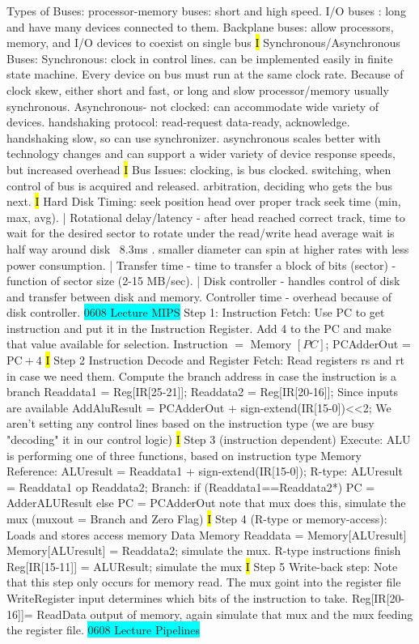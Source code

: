 \documentclass[fontsize=4pt]{scrartcl}
\begin{document}
Types of Buses: processor-memory buses: short and high speed. I/O buses : long and have many devices connected to them. Backplane buses: allow processors, memory, and I/O devices to coexist on single bus
\hl{I}
Synchronous/Asynchronous Buses: Synchronous: clock in control lines. can be implemented easily in finite state machine. Every device on bus must run at the same clock rate. Because of clock skew, either short and fast, or long and slow processor/memory usually synchronous. Asynchronous- not clocked: can accommodate wide variety of devices. handshaking protocol: read-request data-ready, acknowledge. handshaking slow, so can use synchronizer. asynchronous scales better with technology changes and can support a wider variety of device response speeds, but increased overhead
\hl{I} Bus Issues: clocking, is bus clocked. switching, when control of bus is acquired and released. arbitration, deciding who gets the bus next.
\hl{I} Hard Disk Timing: seek position head over proper track seek time (min, max, avg). | Rotational delay/latency - after head reached correct track, time to wait for the desired sector to rotate under the read/write head average wait is half way around disk ~8.3ms . smaller diameter can spin at higher rates with less power consumption. | Transfer time - time to transfer a block of bits (sector) - function of sector size (2-15 MB/sec). | Disk controller - handles control of disk and transfer between disk and memory. Controller time - overhead because of disk controller.
\colorbox{Cyan}{0608 Lecture MIPS} Step 1: Instruction Fetch: Use PC to get instruction and put it in the Instruction Register. Add 4 to the PC and make that value available for selection. Instruction $=$ Memory $[P C]$; PCAdderOut =$\mathrm{PC}+4$
\hl{I}
Step 2 Instruction Decode and Register Fetch: Read registers rs and rt in case we need them. Compute the branch address in case the instruction is a branch Readdata1 = Reg[IR[25-21]]; Readdata2 = Reg[IR[20-16]]; Since inputs are available AddAluResult = PCAdderOut + sign-extend(IR[15-0])<<2;	We aren't setting any control lines based on the instruction type (we are busy "decoding" it in our control logic)
\hl{I}
Step 3 (instruction dependent) Execute: ALU is performing one of three functions, based on instruction type Memory Reference: ALUresult = Readdata1 + sign-extend(IR[15-0]); R-type: ALUresult = Readdata1 op Readdata2; Branch: if (Readdata1==Readdata2*) PC = AdderALUResult else PC = PCAdderOut  note that mux does this, simulate the mux (muxout = Branch and Zero Flag)
\hl{I}
Step 4 (R-type or memory-access): Loads and stores access memory Data Memory Readdata = Memory[ALUresult] Memory[ALUresult] = Readdata2; simulate the mux. R-type instructions finish	Reg[IR[15-11]] = ALUResult;  simulate the mux
\hl{I}
Step 5 Write-back step: Note that this step only occurs for memory read. The mux goint into the register file WriteRegister input determines which bits of the instruction to take.
Reg[IR[20-16]]= ReadData output of memory, again simulate that mux and the mux feeding the register file.
\colorbox{Cyan}{0608 Lecture Pipelines}
\end{document}
